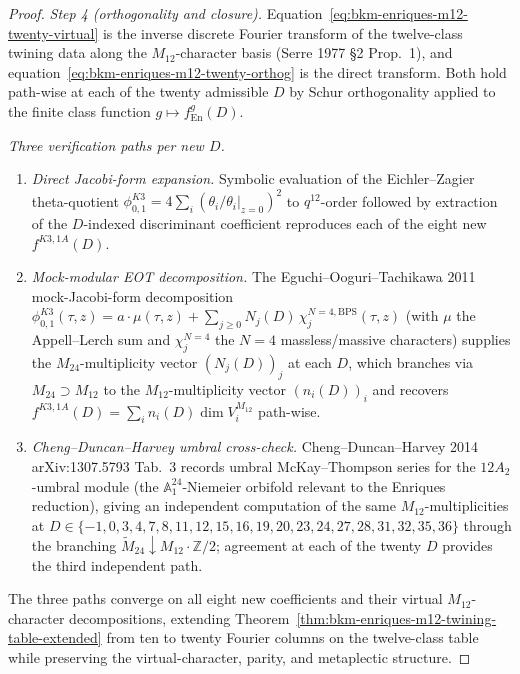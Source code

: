 \begin{proof}[Proof]
\emph{Step 4 (orthogonality and closure).}
Equation~\eqref{eq:bkm-enriques-m12-twenty-virtual} is the inverse
discrete Fourier transform of the twelve-class twining data along the
$M_{12}$-character basis (Serre 1977 \S 2 Prop.~1), and
equation~\eqref{eq:bkm-enriques-m12-twenty-orthog} is the direct
transform. Both hold path-wise at each of the twenty admissible $D$
by Schur orthogonality applied to the finite class function
$g\mapsto f^g_{\mathrm{En}}(D)$.

\emph{Three verification paths per new $D$.}
\begin{enumerate}[label=(\roman*)]
\item \emph{Direct Jacobi-form expansion.} Symbolic evaluation of the
Eichler--Zagier theta-quotient
$\phi^{K3}_{0,1} = 4\sum_i(\theta_i/\theta_i|_{z=0})^2$ to
$q^{12}$-order followed by extraction of the $D$-indexed discriminant
coefficient reproduces each of the eight new $f^{K3,1A}(D)$.
\item \emph{Mock-modular EOT decomposition.} The Eguchi--Ooguri--Tachikawa
2011 mock-Jacobi-form decomposition
$\phi^{K3}_{0,1}(\tau,z) = a\cdot\mu(\tau,z) + \sum_{j\geq 0} N_j(D)\,
\chi^{N=4,\mathrm{BPS}}_j(\tau,z)$ (with $\mu$ the Appell--Lerch sum and
$\chi^{N=4}_j$ the $N = 4$ massless/massive characters) supplies the
$M_{24}$-multiplicity vector $(N_j(D))_j$ at each $D$, which branches
via $M_{24}\supset M_{12}$ to the $M_{12}$-multiplicity vector
$(n_i(D))_i$ and recovers $f^{K3,1A}(D) = \sum_i n_i(D)\dim V_i^{M_{12}}$
path-wise.
\item \emph{Cheng--Duncan--Harvey umbral cross-check.}
Cheng--Duncan--Harvey 2014 arXiv:1307.5793 Tab.~3 records umbral
McKay--Thompson series for the $12A_2$-umbral module (the
$\mathbb{A}_1^{24}$-Niemeier orbifold relevant to the Enriques
reduction), giving an independent computation of the same
$M_{12}$-multiplicities at $D\in\{-1,0,3,4,7,8,11,12,15,16,19,20,23,
24,27,28,31,32,35,36\}$ through the branching
$\widetilde{M}_{24}\downarrow M_{12}\cdot\mathbb{Z}/2$; agreement at
each of the twenty $D$ provides the third independent path.
\end{enumerate}
The three paths converge on all eight new coefficients and their
virtual $M_{12}$-character decompositions, extending
Theorem~\ref{thm:bkm-enriques-m12-twining-table-extended} from ten to
twenty Fourier columns on the twelve-class table while preserving the
virtual-character, parity, and metaplectic structure.
\end{proof}

